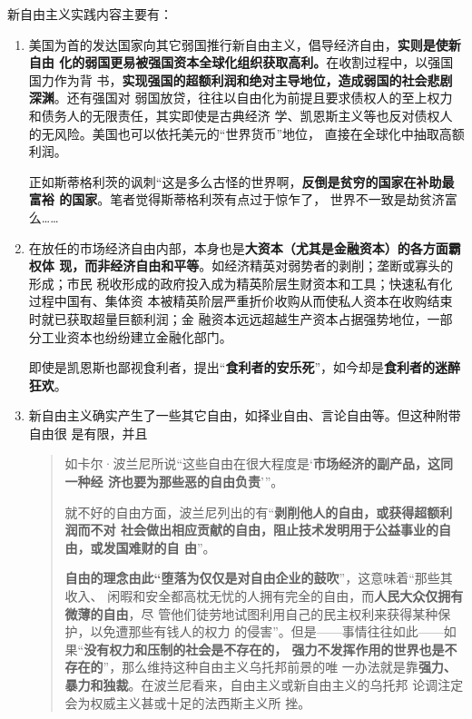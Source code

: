 新自由主义实践内容主要有：
\begin{enumerate}
\item 美国为首的发达国家向其它弱国推行新自由主义，倡导经济自由，\textbf{实则是使新自由
    化的弱国更易被强国资本全球化组织获取高利。}在收割过程中，以强国国力作为背
  书，\textbf{实现强国的超额利润和绝对主导地位，造成弱国的社会悲剧深渊}。还有强国对
  弱国放贷，往往以自由化为前提且要求债权人的至上权力和债务人的无限责任，其实即使是古典经济
  学、凯恩斯主义等也反对债权人的无风险。美国也可以依托美元的“世界货币”地位，
  直接在全球化中抽取高额利润。

  正如斯蒂格利茨的讽刺“这是多么古怪的世界啊，\textbf{反倒是贫穷的国家在补助最富裕
    的国家}。笔者觉得斯蒂格利茨有点过于惊乍了，
  世界不一致是劫贫济富么……


\item 在放任的市场经济自由内部，本身也是\textbf{大资本（尤其是金融资本）的各方面霸权体
    现，而非经济自由和平等}。如经济精英对弱势者的剥削；垄断或寡头的形成；市民
  税收形成的政府投入成为精英阶层生财资本和工具；快速私有化过程中国有、集体资
  本被精英阶层严重折价收购从而使私人资本在收购结束时就已获取超量巨额利润；金
  融资本远远超越生产资本占据强势地位，一部分工业资本也纷纷建立金融化部门。

  即使是凯恩斯也鄙视食利者，提出“\textbf{食利者的安乐死}”，如今却是\textbf{食利者的迷醉
    狂欢}。

\item 新自由主义确实产生了一些其它自由，如择业自由、言论自由等。但这种附带自由很
  是有限，并且
  \begin{quotation}
    如卡尔·波兰尼所说“这些自由在很大程度是‘\textbf{市场经济的副产品，这同一种经
      济也要为那些恶的自由负责}’”。

    就不好的自由方面，波兰尼列出的有“\textbf{剥削他人的自由，或获得超额利润而不对
      社会做出相应贡献的自由，阻止技术发明用于公益事业的自由，或发国难财的自
      由}”。

    \textbf{自由的理念由此“堕落为仅仅是对自由企业的鼓吹}”，这意味着“那些其收入、
    闲暇和安全都高枕无忧的人拥有完全的自由，而\textbf{人民大众仅拥有微薄的自由}，尽
    管他们徒劳地试图利用自己的民主权利来获得某种保护，以免遭那些有钱人的权力
    的侵害”。但是——事情往往如此——如果“\textbf{没有权力和压制的社会是不存在的，
      强力不发挥作用的世界也是不存在的}”，那么维持这种自由主义乌托邦前景的唯
    一办法就是靠\textbf{强力、暴力和独裁}。在波兰尼看来，自由主义或新自由主义的乌托邦
    论调注定会为权威主义甚或十足的法西斯主义所
    挫。 
  \end{quotation}


\end{enumerate}
